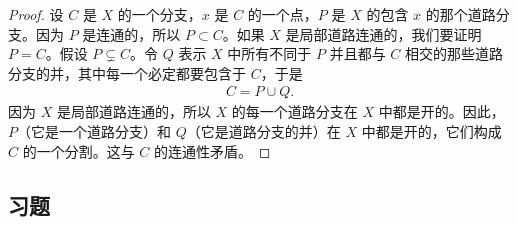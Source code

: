 \begin{proof}
设 $C$ 是 $X$ 的一个分支，$x$ 是 $C$ 的一个点，$P$ 是 $X$ 的包含 $x$ 的那个道路分支。因为 $P$ 是连通的，所以 $P\subset C$。如果 $X$ 是局部道路连通的，我们要证明 $P=C$。假设 $P\subsetneq C$。令 $Q$ 表示 $X$ 中所有不同于 $P$ 并且都与 $C$ 相交的那些道路分支的并，其中每一个必定都要包含于 $C$，于是
\begin{align*}
C=P\cup Q.
\end{align*}
因为 $X$ 是局部道路连通的，所以 $X$ 的每一个道路分支在 $X$ 中都是开的。因此，$P$（它是一个道路分支）和 $Q$（它是道路分支的并）在 $X$ 中都是开的，它们构成 $C$ 的一个分割。这与 $C$ 的连通性矛盾。
\end{proof}

\subsection*{习题}

